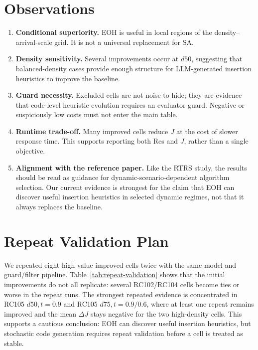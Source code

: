 \documentclass[11pt]{article}
\begin{document}






\section{Observations}
\begin{enumerate}[leftmargin=*]
  \item \textbf{Conditional superiority.} EOH is useful in local regions of the density--arrival-scale grid. It is not a universal replacement for SA.
  \item \textbf{Density sensitivity.} Several improvements occur at \(d50\), suggesting that balanced-density cases provide enough structure for LLM-generated insertion heuristics to improve the baseline.
  \item \textbf{Guard necessity.} Excluded cells are not noise to hide; they are evidence that code-level heuristic evolution requires an evaluator guard. Negative or suspiciously low costs must not enter the main table.
  \item \textbf{Runtime trade-off.} Many improved cells reduce \(J\) at the cost of slower response time. This supports reporting both Res and \(J\), rather than a single objective.
  \item \textbf{Alignment with the reference paper.} Like the RTRS study, the results should be read as guidance for dynamic-scenario-dependent algorithm selection. Our current evidence is strongest for the claim that EOH can discover useful insertion heuristics in selected dynamic regimes, not that it always replaces the baseline.
\end{enumerate}

\section{Repeat Validation Plan}
We repeated eight high-value improved cells twice with the same model and guard/filter pipeline. Table~\ref{tab:repeat-validation} shows that the initial improvements do not all replicate: several RC102/RC104 cells become ties or worse in the repeat runs. The strongest repeated evidence is concentrated in RC105 \(d50,t=0.9\) and RC105 \(d75,t=0.9/0.6\), where at least one repeat remains improved and the mean \(\Delta J\) stays negative for the two high-density cells. This supports a cautious conclusion: EOH can discover useful insertion heuristics, but stochastic code generation requires repeat validation before a cell is treated as stable.
\end{document}

